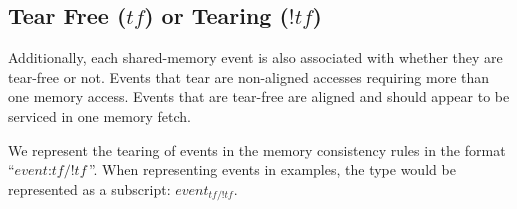 
    \subsection{Tear Free ($tf$) or Tearing ($!tf$)}
        Additionally, each shared-memory event is also associated with whether they are tear-free or not. 
        Events that tear are non-aligned accesses requiring more than one memory access. 
        Events that are tear-free are aligned and should appear to be serviced in one memory fetch\footnotemark.

        We represent the tearing of events in the memory consistency rules in the format ``$\textit{event} : \textit{tf/!tf}$''. 
        When representing events in examples, the type would be represented as a subscript: $\textit{event}_\textit{tf/!tf}$. 
       
                       